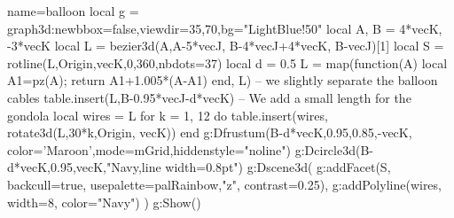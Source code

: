 \documentclass[border=5pt]{standalone}
\begin{document}
\begin{luadraw}{name=balloon}
local g = graph3d:new{bbox=false,viewdir={35,70},bg="LightBlue!50"}
local A, B = 4*vecK, -3*vecK
local L = bezier3d(A,A-5*vecJ, B-4*vecJ+4*vecK, B-vecJ)[1]
local S = rotline(L,{Origin,vecK},0,360,{nbdots=37})
local d = 0.5
L = map(function(A) local A1=pz(A); return A1+1.005*(A-A1) end, L) -- we slightly separate the balloon cables
table.insert(L,B-0.95*vecJ-d*vecK) -- We add a small length for the gondola
local wires = {L}
for k = 1, 12 do
    table.insert(wires, rotate3d(L,30*k,{Origin, vecK}))
end
g:Dfrustum(B-d*vecK,0.95,0.85,-vecK, {color='Maroon',mode=mGrid,hiddenstyle="noline"})
g:Dcircle3d(B-d*vecK,0.95,vecK,"Navy,line width=0.8pt")
g:Dscene3d( g:addFacet(S, {backcull=true, usepalette={palRainbow,"z", contrast=0.25}}),
    g:addPolyline(wires, {width=8, color="Navy"})
)
g:Show()
\end{luadraw}
\end{document}
